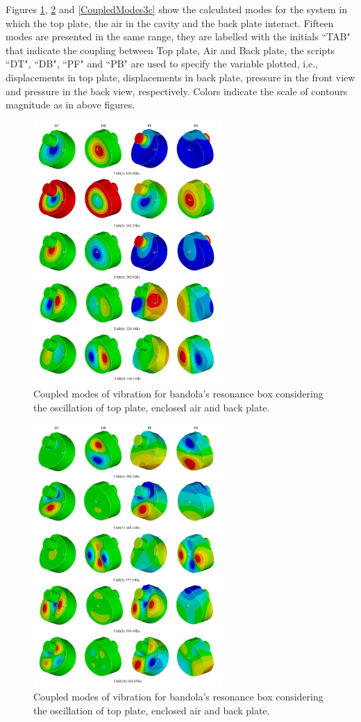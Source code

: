 Figures \ref{CoupledModes3a}, \ref{CoupledModes3b} and \ref{CoupledModes3c} show the calculated modes for the system in which the top plate, the air in the cavity and the back plate interact. Fifteen modes are presented in the same range, they are labelled with the initials ``TAB" that indicate the coupling between Top plate, Air and Back plate, the scripts ``DT", ``DB", ``PF" and ``PB" are used to specify the variable plotted, i.e., displacements in top plate, displacements in back plate, pressure in the front view and pressure in the back view, respectively. Colors indicate the scale of contours magnitude as in above figures.

\begin{figure}[h]
\centering
\includegraphics[height=10cm]{img/FSI3a.png}
\caption{Coupled modes of vibration for bandola's resonance box considering the oscillation of top plate, enclosed air and back plate.}
\label{CoupledModes3a}
\end{figure}

\begin{figure}[h]
\centering
\includegraphics[height=10cm]{img/FSI3b.png}
\caption{Coupled modes of vibration for bandola's resonance box considering the oscillation of top plate, enclosed air and back plate.}
\label{CoupledModes3b}
\end{figure}

